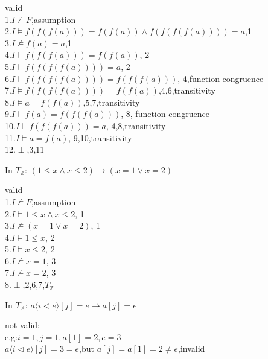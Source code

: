 \documentclass[11pt,a4paper]{article}
\renewcommand{\int}{\mathbb{Z}}
\newcommand{\upd}[2]{\langle #1 \triangleleft #2 \rangle}
\begin{document}
\begin{solution}
	valid\\
   1.$I \not \models F$,assumption\\
   2.$I \models f(f(f(a))) = f(f(a)) \land f(f(f(f(a)))) = a$,1\\
   3.$I \not \models f(a) = a$,1\\
   4.$I \models f(f(f(a))) = f(f(a))$, 2\\
   5.$I \models f(f(f(f(a)))) = a$, 2\\
   6.$I \models f(f(f(f(a)))) = f(f(f(a)))$, 4,function congruence\\
   7.$I \models f(f(f(f(a)))) = f(f(a))$,4,6,transitivity\\
   8.$I \models a = f(f(a))$,5,7,transitivity\\
   9.$I \models f(a) = f(f(f(a)))$, 8, function congruence\\
   10.$I \models f(f(f(a))) = a$, 4,8,transitivity\\
   11.$I \models a = f(a)$, 9,10,transitivity\\
   12.$\perp$,3,11\\
\end{solution}

\subproblem In $T_\int$: $(1 \le x \land x \le 2) \to (x = 1 \lor x = 2)$

\begin{solution}
    valid\\
    1.$I \not \models F$,assumption\\
    2.$I \models 1 \le x \land x \le 2$, 1\\
    3.$I \not \models (x = 1 \lor x = 2)$, 1\\
    4.$I \models 1 \le x $, 2\\
    5.$I \models x \le 2$, 2\\
    6.$I \not \models x = 1$, 3\\
    7.$I \not \models x = 2$, 3\\
    8.$\perp$,2,6,7,$T_\int$\\
\end{solution}

\subproblem In $T_A$: $a \upd{i}{e} [j]= e \to a[j] = e$

\begin{solution}
not valid:\\
e.g:$i = 1, j = 1, a[1] = 2, e = 3$\\
$a \upd{i}{e} [j] = 3 = e$,but $a[j] = a[1] = 2 \neq e$,invalid
\end{solution}
\end{document}
